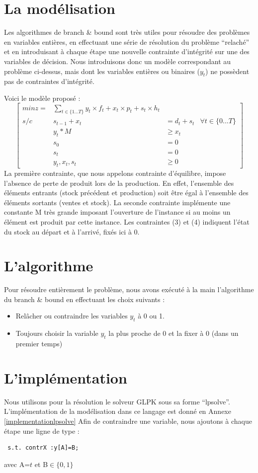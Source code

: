 \documentclass[a4paper,11pt,twoside]{report}
\begin{document}
\section{La modélisation}
Les algorithmes de branch \& bound sont très utiles pour résoudre des problèmes en variables entières, en effectuant une série de résolution du problème ``relaché'' et en introduisant à chaque étape une nouvelle contrainte d'intégrité sur une des variables de décision.
Nous introduisons donc un modèle correspondant au problème ci-dessus, mais dont les variables entières ou binaires ($y_t$) ne possèdent pas de contraintes d’intégrité.

Voici le modèle proposé :
\[
 \left[ \begin{matrix}
         min z= & \displaystyle \sum_{t\in \{1...T\}} y_t \times f_t + x_t \times p_t + s_t \times h_t \\
         s/c & s_{t-1}+x_{t}& =d_t+s_t & \forall t\in \{0...T\} \\
         & y_t*M &\geq x_t \\
         &s_0&=0\\
         &s_t&=0\\
         &y_t,x_t,s_t&\geq 0
        \end{matrix}
 \right]
\]
La première contrainte, que nous appelons contrainte d'équilibre, impose l'absence de perte de produit lors de la production. En effet, l'ensemble des éléments entrants (stock précédent et production) soit être égal à l'ensemble des éléments sortants (ventes et stock).
La seconde contrainte implémente une constante M très grande imposant l'ouverture de l'instance si au moins un élément est produit par cette instance.
Les contraintes (3) et (4) indiquent l'état du stock au départ et à l'arrivé, fixés ici à 0.
\newpage
\section{L'algorithme}
Pour résoudre entièrement le problème, nous avons exécuté à la main l'algorithme du branch \& bound en effectuant les choix suivants :
\begin{itemize}
 \item Relâcher ou contraindre les variables $y_t$ à 0 ou 1.
 \item Toujours choisir la variable $y_t$ la plus proche de 0 et la fixer à 0 (dans un premier temps)
\end{itemize}

\section{L'implémentation}
Nous utilisons pour la résolution le solveur GLPK sous sa forme ``lpsolve''. L'implémentation de la modélisation dans ce langage est donné en Annexe \ref{implementationlpsolve}
Afin de contraindre une variable, nous ajoutons à chaque étape une ligne de type :
\begin{verbatim}
 s.t. contrX :y[A]=B;
\end{verbatim}
 avec A=$t$ et B$\in \{0,1\}$
 
\end{document}
